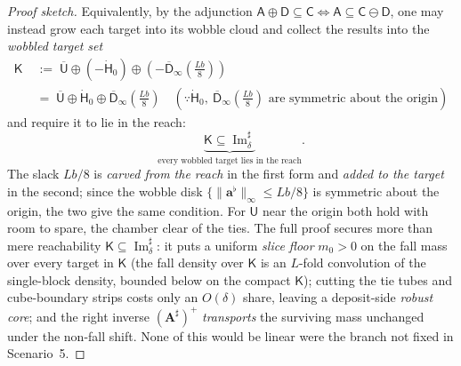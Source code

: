 \documentclass[11pt]{article}
\theoremstyle{definition}
\begin{document}
\begin{proof}[Proof sketch]
\smallskip\noindent Equivalently, by the adjunction $\mathsf{A}\oplus\mathsf{D}\subseteq\mathsf{C} \Leftrightarrow \mathsf{A}\subseteq\mathsf{C}\ominus\mathsf{D}$, one may instead grow each target into its wobble cloud and collect the results into the \emph{wobbled target set}
\[
\begin{aligned}
  \mathsf{K} &\;:=\; \overline{\mathsf{U}}\oplus(-\dot{\mathsf{H}}_0)\oplus(-\overline{\mathsf{D}}_\infty(\tfrac{Lb}{8})) \\
  &\;=\; \overline{\mathsf{U}}\oplus\dot{\mathsf{H}}_0\oplus\overline{\mathsf{D}}_\infty(\tfrac{Lb}{8})
     \quad (\because \dot{\mathsf{H}}_0,\ \overline{\mathsf{D}}_\infty(\tfrac{Lb}{8}) \text{ are symmetric about the origin})
\end{aligned}
\]
and require it to lie in the reach:
\[
  \underbrace{\mathsf{K}\subseteq\operatorname{Im}^{\sharp}_{\delta}}_{\text{every wobbled target lies in the reach}} .
\]
The slack $Lb/8$ is \emph{carved from the reach} in the first form and \emph{added to the target} in the second; since the wobble disk $\{\|\mathbf{a}^{\flat}\|_\infty\leq Lb/8\}$ is symmetric about the origin, the two give the same condition. For $\mathsf{U}$ near the origin both hold with room to spare, the chamber clear of the ties. The full proof secures more than mere reachability $\mathsf{K}\subseteq\operatorname{Im}^{\sharp}_{\delta}$: it puts a uniform \emph{slice floor} $m_0>0$ on the fall mass over every target in $\mathsf{K}$ (the fall density over $\mathsf{K}$ is an $L$-fold convolution of the single-block density, bounded below on the compact $\mathsf{K}$); cutting the tie tubes and cube-boundary strips costs only an $O(\delta)$ share, leaving a deposit-side \emph{robust core}; and the right inverse $(\mathbf{A}^{\sharp})^{+}$ \emph{transports} the surviving mass unchanged under the non-fall shift. None of this would be linear were the branch not fixed in Scenario~5.


\end{proof}
\end{document}
